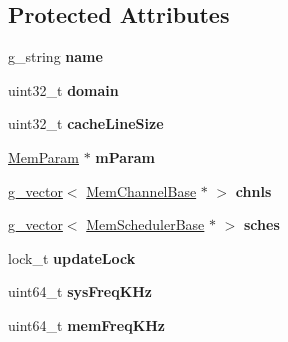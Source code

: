 \subsection*{Protected Attributes}
\begin{DoxyCompactItemize}
\item 
\hypertarget{classMemControllerBase_a365a95eafef280acf977109508e3822a}{g\-\_\-string {\bfseries name}}\label{classMemControllerBase_a365a95eafef280acf977109508e3822a}

\item 
\hypertarget{classMemControllerBase_aa53b4d80588c5b80992893d5b0a77290}{uint32\-\_\-t {\bfseries domain}}\label{classMemControllerBase_aa53b4d80588c5b80992893d5b0a77290}

\item 
\hypertarget{classMemControllerBase_aac8a82822840a4e9429177aad75a5bc0}{uint32\-\_\-t {\bfseries cache\-Line\-Size}}\label{classMemControllerBase_aac8a82822840a4e9429177aad75a5bc0}

\item 
\hypertarget{classMemControllerBase_af90c06727fb05d8c341766203da95662}{\hyperlink{classMemParam}{Mem\-Param} $\ast$ {\bfseries m\-Param}}\label{classMemControllerBase_af90c06727fb05d8c341766203da95662}

\item 
\hypertarget{classMemControllerBase_a1f0b99d0eebdb37e2b04872592e8a6c7}{\hyperlink{classg__vector}{g\-\_\-vector}$<$ \hyperlink{classMemChannelBase}{Mem\-Channel\-Base} $\ast$ $>$ {\bfseries chnls}}\label{classMemControllerBase_a1f0b99d0eebdb37e2b04872592e8a6c7}

\item 
\hypertarget{classMemControllerBase_ad7e4edf131b22ee25f13005c0adedeb8}{\hyperlink{classg__vector}{g\-\_\-vector}$<$ \hyperlink{classMemSchedulerBase}{Mem\-Scheduler\-Base} $\ast$ $>$ {\bfseries sches}}\label{classMemControllerBase_ad7e4edf131b22ee25f13005c0adedeb8}

\item 
\hypertarget{classMemControllerBase_a4213279ff6df93d1c57931d4258a0914}{lock\-\_\-t {\bfseries update\-Lock}}\label{classMemControllerBase_a4213279ff6df93d1c57931d4258a0914}

\item 
\hypertarget{classMemControllerBase_a4e70d2029307bb11b52d92b3fafc3703}{uint64\-\_\-t {\bfseries sys\-Freq\-K\-Hz}}\label{classMemControllerBase_a4e70d2029307bb11b52d92b3fafc3703}

\item 
\hypertarget{classMemControllerBase_ab00504a6cd30b54b33d68052301b0eb5}{uint64\-\_\-t {\bfseries mem\-Freq\-K\-Hz}}\label{classMemControllerBase_ab00504a6cd30b54b33d68052301b0eb5}


\end{DoxyCompactItemize}

